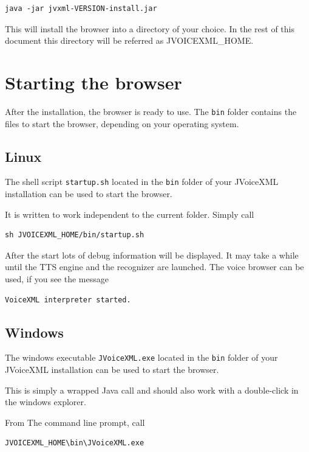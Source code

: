 \documentclass[11pt,a4paper]{article}
\begin{document}
\begin{lstlisting}
java -jar jvxml-VERSION-install.jar
\end{lstlisting}

This will install the browser into a directory of your choice.
In the rest of this document this directory will be referred as
JVOICE\-XML\_HOME.

\section{Starting the browser}

After the installation, the browser is ready to use. 
The \texttt{bin} folder contains the files to start the browser,
depending on your operating system.

\subsection{Linux}

The shell script \texttt{startup.sh} located in the \texttt{bin} folder
of your JVoiceXML installation can be used to start the browser.

It is written to work independent to the current folder. Simply call

\begin{lstlisting}
sh JVOICEXML_HOME/bin/startup.sh
\end{lstlisting}

After the start lots of debug information will be displayed.
It may take a while until the TTS engine and the recognizer are launched.
The voice browser can be used, if you see the message

\begin{lstlisting}
VoiceXML interpreter started.
\end{lstlisting}

\subsection{Windows}

The windows executable \texttt{JVoiceXML.exe} located in the \texttt{bin}
folder of your JVoiceXML installation can be used to start the browser.

This is simply a wrapped Java call and should also work with a double-click
in the windows explorer.

From The command line prompt, call

\begin{lstlisting}
JVOICEXML_HOME\bin\JVoiceXML.exe
\end{lstlisting}
\end{document}
